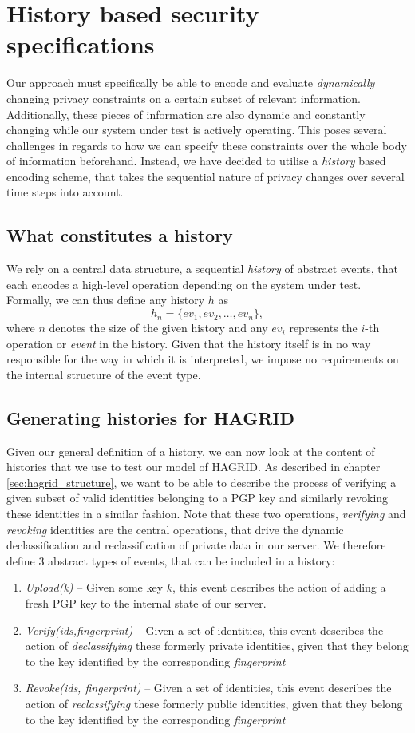 \section{History based security specifications}
\label{sec:history_def}
Our approach must specifically be able to encode and evaluate \emph{dynamically} changing privacy constraints on a certain subset of relevant information. Additionally, these pieces of information are also dynamic and constantly changing while our system under test is actively operating. This poses several challenges in regards to how we can specify these constraints over the whole body of information beforehand. 
Instead, we have decided to utilise a \emph{history} based encoding scheme, that takes the sequential nature of privacy changes over several time steps into account.
\subsection{What constitutes a history}
We rely on a central data structure, a sequential \emph{history} of abstract events, that each encodes a high-level operation depending on the system under test.
Formally, we can thus define any history \(h\) as
\[
    h_n = \{ev_1,ev_2,\dots, ev_n\},
\]
where \(n\) denotes the size of the given history and any \(ev_i\) represents the \(i\)-th operation or \emph{event} in the history.
Given that the history itself is in no way responsible for the way in which it is interpreted, we impose no requirements on the internal structure of the event type.
\subsection{Generating histories for HAGRID}
Given our general definition of a history, we can now look at the content of histories that we use to test our model of HAGRID. 
As described in chapter \ref{sec:hagrid_structure}, we want to be able to describe the process of verifying a given subset of valid identities belonging to a PGP key and similarly revoking these identities in a similar fashion. Note that these two operations, \emph{verifying} and \emph{revoking} identities are the central operations, that drive the dynamic declassification and reclassification of private data in our server.
We therefore define 3 abstract types of events, that can be included in a history: 
\begin{enumerate}
    \item \emph{Upload(k)} -- Given some key \(k\), this event describes the action of adding a fresh PGP key to the internal state of our server.
    \item \emph{Verify(ids,fingerprint)} -- Given a set of identities, this event describes the action of \emph{declassifying} these formerly private identities, given that they belong to the key identified by the corresponding \emph{fingerprint}
    \item \emph{Revoke(ids, fingerprint)} -- Given a set of identities, this event describes the action of \emph{reclassifying} these formerly public identities, given that they belong to the key identified by the corresponding \emph{fingerprint}
\end{enumerate}

